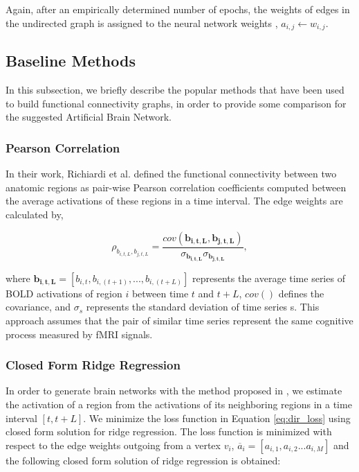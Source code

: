 \documentclass[runningheads]{llncs}
\begin{document}
Again, after an empirically determined number of epochs, the weights of edges in the undirected graph is assigned to the neural network weights , $a_{i,j} \gets w_{i,j}$.

\subsection{Baseline Methods}

In this subsection, we briefly describe the popular methods that have been used to build functional connectivity graphs, in order to provide some comparison for the suggested Artificial Brain Network.

\subsubsection{Pearson Correlation}

In their work, Richiardi et al. \cite{richiardi2011decoding} defined the functional connectivity between two anatomic regions as pair-wise Pearson correlation coefficients computed between the average activations of these regions in a time interval. The edge weights are calculated by,

\begin{equation}
\rho_{b_{i,t,L}, b_{j,t,L}} = \frac{cov(\mathbf{b_{i,t,L}}, \mathbf{b_{j,t,L}})}{\sigma_{\mathbf{b_{i,t,L}} } \sigma_{\mathbf{ b_{j,t,L}} }  } ,
\end{equation}

where $\mathbf{b_{i,t,L}} = [b_{i,t}, b_{i,(t+1)}, ... , b_{i,(t+L)}]$ represents the average time series of BOLD activations of region $i$ between time $t$ and $t+L$, $cov()$ defines the covariance, and $\sigma_{s}$ represents the standard deviation of time series s. This approach assumes that the pair of similar time series represent the same cognitive process measured by fMRI signals.

\subsubsection{Closed Form Ridge Regression}


In order to generate brain networks with the method proposed in \cite{onal2015modeling}, we estimate the activation of a region from the activations of its neighboring regions in a time interval $[t, t+L]$. We minimize the loss function in Equation \ref{eq:dir_loss} using closed form solution for ridge regression. The loss function is minimized with respect to the edge weights outgoing from a vertex $v_i$, $ \overline{a}_{i} = [ a_{i,1}, a_{i,2} ... a_{i,M} ]$ and the following closed form solution of ridge regression is obtained:
\end{document}
